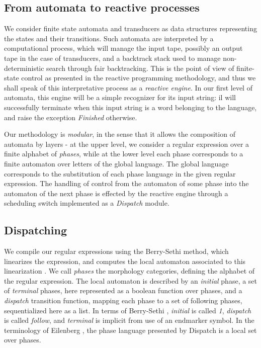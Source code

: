 \subsection{From automata to reactive processes}

We consider finite state automata and transducers as data structures representing the
states and their transitions. Such automata are interpreted by a computational process,
which will manage the input tape, possibly an output tape in the case of transducers,
and a backtrack stack used to manage non-deterministic search through fair backtracking. 
This is the point of view of finite-state control as presented in the reactive programming
methodology, and thus we shall speak of this interpretative process as a {\sl reactive engine}.
In our first level of automata, this engine will be a simple recognizer for its input string:
il will successfully terminate when this input string is a word belonging to the language,
and raise the exception {\sl Finished} otherwise.

Our methodology is {\sl modular}, in the sense that it allows the composition of automata
by layers - at the upper level, we consider a regular expression over a finite alphabet of 
{\sl phases}, while at the lower level each phase corresponds to a finite automaton over
letters of the global language. The global language corresponds to the substitution of
each phase language in the given regular expression. The handling of control from the automaton
of some phase into the automaton of the next phase is effected by the reactive engine through
a scheduling switch implemented as a {\sl Dispatch} module. 

\subsection{Dispatching}

We compile our regular expressions using the Berry-Sethi method, which
linearizes the expression, and computes the local automaton associated
to this linearization \cite{berrysethi,berstelpin}. We call {\em phases}
the morphology categories, defining the alphabet of the regular expression.
The local automaton is described by an {\sl initial} phase, 
a set of {\sl terminal} phases, here represented as
a boolean function over phases, and a {\sl dispatch} transition function,
mapping each phase to a set of following phases, sequentialized here as a list.
In terms of Berry-Sethi \cite{berrysethi}, {\sl initial} is called {\sl 1}, 
{\sl dispatch} is called {\sl follow}, and {\sl terminal} is implicit from
use of an endmarker symbol.
In the terminology of Eilenberg \cite{eilenberg}, the phase language
presented by Dispatch is a local set over phases. 

